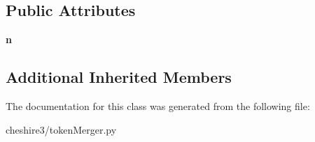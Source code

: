 \subsection*{Public Attributes}
\begin{DoxyCompactItemize}
\item 
\hypertarget{classcheshire3_1_1token_merger_1_1_n_gram_token_merger_ab3353755caf58b3811a0ab11a0d2ceb6}{{\bfseries n}}\label{classcheshire3_1_1token_merger_1_1_n_gram_token_merger_ab3353755caf58b3811a0ab11a0d2ceb6}

\end{DoxyCompactItemize}
\subsection*{Additional Inherited Members}


The documentation for this class was generated from the following file\-:\begin{DoxyCompactItemize}
\item 
cheshire3/token\-Merger.\-py\end{DoxyCompactItemize}
